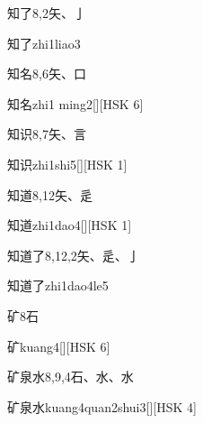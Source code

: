 \begin{Entry}{知了}{8,2}{⽮、⼅}
  \begin{Phonetics}{知了}{zhi1liao3}
  \end{Phonetics}
\end{Entry}

\begin{Entry}{知名}{8,6}{⽮、⼝}
  \begin{Phonetics}{知名}{zhi1 ming2}[][HSK 6]
  \end{Phonetics}
\end{Entry}

\begin{Entry}{知识}{8,7}{⽮、⾔}
  \begin{Phonetics}{知识}{zhi1shi5}[][HSK 1]
  \end{Phonetics}
\end{Entry}

\begin{Entry}{知道}{8,12}{⽮、⾡}
  \begin{Phonetics}{知道}{zhi1dao4}[][HSK 1]
  \end{Phonetics}
\end{Entry}

\begin{Entry}{知道了}{8,12,2}{⽮、⾡、⼅}
  \begin{Phonetics}{知道了}{zhi1dao4le5}
  \end{Phonetics}
\end{Entry}

\begin{Entry}{矿}{8}{⽯}
  \begin{Phonetics}{矿}{kuang4}[][HSK 6]
  \end{Phonetics}
\end{Entry}

\begin{Entry}{矿泉水}{8,9,4}{⽯、⽔、⽔}
  \begin{Phonetics}{矿泉水}{kuang4quan2shui3}[][HSK 4]
  \end{Phonetics}
\end{Entry}

